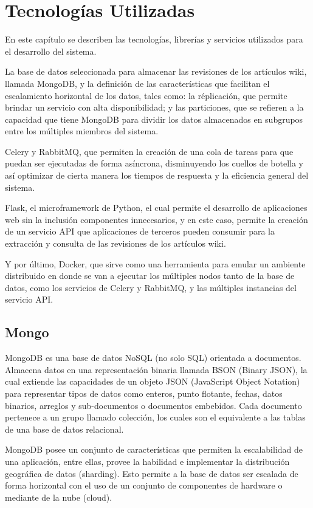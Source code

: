 \section{Tecnologías Utilizadas}

En este capítulo se describen las tecnologías, librerías y servicios utilizados para el desarrollo
del sistema.

La base de datos seleccionada para almacenar las revisiones de los artículos wiki, llamada MongoDB,
y la definición de las características que facilitan el escalamiento horizontal de los datos, tales como: la réplicación,
que permite brindar un servicio con alta disponibilidad; y las particiones, que se refieren a la capacidad
que tiene MongoDB para dividir los datos almacenados en subgrupos entre los múltiples miembros del sistema.

Celery y RabbitMQ, que permiten la creación de una cola de tareas para que puedan ser ejecutadas de forma asíncrona,
disminuyendo los cuellos de botella y así optimizar de cierta manera los tiempos de respuesta y la eficiencia
general del sistema.

Flask, el microframework de Python, el cual permite el desarrollo de aplicaciones web
sin la inclusión componentes innecesarios, y en este caso, permite la creación de un servicio API que aplicaciones
de terceros pueden consumir para la extracción y consulta de las revisiones de los artículos wiki.

Y por último, Docker, que sirve como una herramienta para emular un ambiente distribuido en donde
se van a ejecutar los múltiples nodos tanto de la base de datos, como los servicios de Celery y RabbitMQ, y
las múltiples instancias del servicio API.

\subsection{Mongo}

MongoDB es una base de datos NoSQL (no solo SQL) orientada a documentos. Almacena
datos en una representación binaria llamada BSON (Binary JSON), la cual extiende
las capacidades de un objeto JSON (JavaScript Object Notation) para representar
tipos de datos como enteros, punto flotante, fechas, datos binarios, arreglos y sub-documentos o
documentos embebidos. Cada documento pertenece a un grupo llamado colección, los cuales son el
equivalente a las tablas de una base de datos relacional.

MongoDB posee un conjunto de  características que permiten la escalabilidad de una aplicación, entre ellas,
provee la habilidad e implementar la distribución geográfica de datos (sharding). Esto permite a la
base de datos ser escalada de forma horizontal con el uso de un conjunto de componentes de hardware o mediante
de la nube (cloud).

